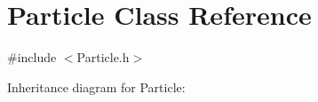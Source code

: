 \hypertarget{classParticle}{}\section{Particle Class Reference}
\label{classParticle}


{\ttfamily \#include $<$Particle.\+h$>$}



Inheritance diagram for Particle\+:
